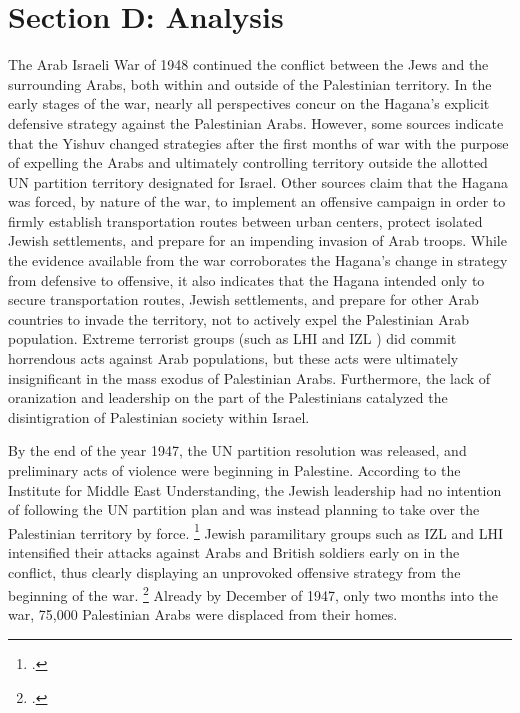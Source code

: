 \documentclass[12pt]{turabian-researchpaper}
\begin{document}

\section{Section D: Analysis}



The Arab Israeli War of 1948 continued the conflict between the Jews and the surrounding Arabs, both within and outside of the Palestinian territory.  In the early stages of the war, nearly all perspectives concur on the Hagana's explicit defensive strategy against the Palestinian Arabs.
However, some sources indicate that the Yishuv changed strategies after the first months of war with the purpose of expelling the Arabs and ultimately controlling territory outside the allotted UN partition territory designated for Israel.  Other sources claim that the Hagana was forced, by nature of the war, to implement an offensive campaign in order to firmly establish transportation routes between urban centers, protect isolated Jewish settlements, and prepare for an impending invasion of Arab troops.
While the evidence available from the war corroborates the Hagana's change in strategy from defensive to offensive, it also indicates that the Hagana intended only to secure transportation routes, Jewish settlements, and prepare for other Arab countries to invade the territory, not to actively expel the Palestinian Arab population.  Extreme terrorist groups (such as LHI and IZL ) did commit horrendous acts against Arab populations, but these acts were ultimately insignificant in the mass exodus of Palestinian Arabs.  Furthermore, the lack of oranization and leadership on the part of the Palestinians catalyzed the disintigration of Palestinian society within Israel.



By the end of the year 1947, the UN partition resolution was released, and preliminary acts of violence were beginning in Palestine.  According to the Institute for Middle East Understanding, the Jewish leadership had no intention of following the UN partition plan and was instead planning to take over the Palestinian territory by force.
\footcite{nabka}
Jewish paramilitary groups such as IZL and LHI intensified their attacks against Arabs and British soldiers early on in the conflict, thus clearly displaying an unprovoked offensive strategy from the beginning of the war.
\footcite{nabka}
Already by December of 1947, only two months into the war, 75,000 Palestinian Arabs were displaced from their homes.
\end{document}
